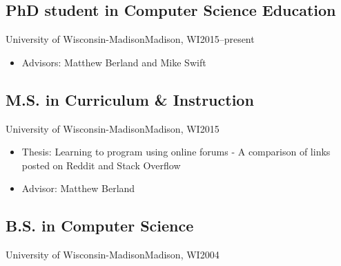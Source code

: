 \documentclass[../main.tex]{subfiles}
\begin{document}

\subsection{PhD student in Computer Science Education}{University of Wisconsin-Madison}{Madison, WI}{2015--present}
	\begin{itemize}
	\item{Advisors: Matthew Berland and Mike Swift}
	\end{itemize}


	\subsection{M.S. in Curriculum \& Instruction}{University of Wisconsin-Madison}{Madison, WI}{2015}
	\begin{itemize}
	\item{Thesis: Learning to program using online forums - A comparison of links posted on Reddit and Stack Overflow}
	\item{Advisor: Matthew Berland}
	\end{itemize}

	\subsection{B.S. in Computer Science}{University of Wisconsin-Madison}{Madison, WI}{2004}
\end{document}
